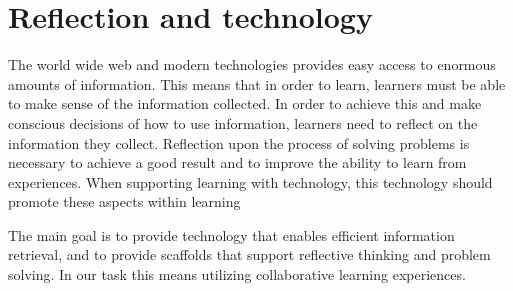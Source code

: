 \section{Reflection and technology}
The world wide web and modern technologies provides easy access to enormous amounts of information. This means that in order to learn, learners must be able to make sense of the information collected.  
In order to achieve this and make conscious decisions of how to use information, learners need to reflect on the information they collect. Reflection upon the process of solving problems is necessary to achieve a good result and to improve the ability to learn from experiences. When supporting learning with technology, this technology should promote these aspects within learning\cite{Lin1999}

The main goal is to provide technology that enables efficient information retrieval, and to provide scaffolds that support reflective thinking and problem solving. In our task this means utilizing collaborative learning experiences. 


